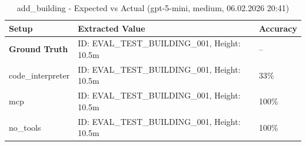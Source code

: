 \documentclass[a4paper,11pt]{article}
\begin{document}
\begin{table}[H]
\centering
\scriptsize
\caption{add\_building - Expected vs Actual (gpt-5-mini, medium, 06.02.2026 20:41)}
\begin{tabular}{l l l}
\toprule
Setup & Extracted Value & Accuracy \\
\midrule
\textbf{Ground Truth} & ID: EVAL\_TEST\_BUILDING\_001, Height: 10.5m & -- \\
\midrule
code\_interpreter & ID: EVAL\_TEST\_BUILDING\_001, Height: 10.5m & 33\% \\
mcp & ID: EVAL\_TEST\_BUILDING\_001, Height: 10.5m & 100\% \\
no\_tools & ID: EVAL\_TEST\_BUILDING\_001, Height: 10.5m & 100\% \\
\bottomrule
\end{tabular}
\end{table}

\clearpage
\end{document}
